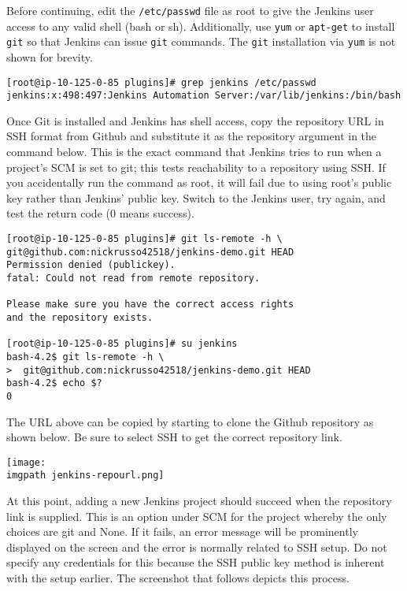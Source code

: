 Before continuing, edit the \verb|/etc/passwd| file as root to give the
Jenkins user access to any valid shell (bash or sh). Additionally, use \verb|yum|
or \verb|apt-get| to install \verb|git| so that Jenkins can issue \verb|git|
commands. The \verb|git| installation via \verb|yum| is not shown for brevity.

\begin{verbatim}
[root@ip-10-125-0-85 plugins]# grep jenkins /etc/passwd
jenkins:x:498:497:Jenkins Automation Server:/var/lib/jenkins:/bin/bash
\end{verbatim}

Once Git is installed and Jenkins has shell access, copy the repository URL in
SSH format from Github and substitute it as the repository argument in the
command below. This is the exact command that Jenkins tries to run when a
project's SCM is set to git; this tests reachability to a repository using
SSH\@. If you accidentally run the command as root, it will fail due to using
root's public key rather than Jenkins' public key. Switch to the Jenkins user,
try again, and test the return code (0 means success).

\begin{verbatim}
[root@ip-10-125-0-85 plugins]# git ls-remote -h \
git@github.com:nickrusso42518/jenkins-demo.git HEAD
Permission denied (publickey).
fatal: Could not read from remote repository.

Please make sure you have the correct access rights
and the repository exists.

[root@ip-10-125-0-85 plugins]# su jenkins
bash-4.2$ git ls-remote -h \
>  git@github.com:nickrusso42518/jenkins-demo.git HEAD
bash-4.2$ echo $?
0
\end{verbatim}

The URL above can be copied by starting to clone the Github repository as
shown below. Be sure to select SSH to get the correct repository link.

    \begin{minipage}[t]{\linewidth}
	  \centering
      \texttt{[image: \\imgpath jenkins-repourl.png]}
    \end{minipage}

At this point, adding a new Jenkins project should succeed when the repository
link is supplied. This is an option under SCM for the project whereby the only
choices are git and None. If it fails, an error message will be prominently
displayed on the screen and the error is normally related to SSH setup. Do not
specify any credentials for this because the SSH public key method is inherent
with the setup earlier. The screenshot that follows depicts this process.


